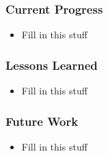 \documentclass[final]{beamer}
\begin{document}
\begin{frame}
	\frametitle{Current Progress}
	\begin{beamerboxesrounded}[shadow]{}
		\begin{itemize}
			\item{Fill in this stuff}
		\end{itemize}
	\end{beamerboxesrounded}
\end{frame}

\begin{frame}
	\frametitle{Lessons Learned}
	\begin{beamerboxesrounded}[shadow]{}
		\begin{itemize}
			\item{Fill in this stuff}
		\end{itemize}
	\end{beamerboxesrounded}
\end{frame}

\begin{frame}
	\frametitle{Future Work}
	\begin{beamerboxesrounded}[shadow]{}
		\begin{itemize}
			\item{Fill in this stuff}
		\end{itemize}
	\end{beamerboxesrounded}
\end{frame}
\end{document}
